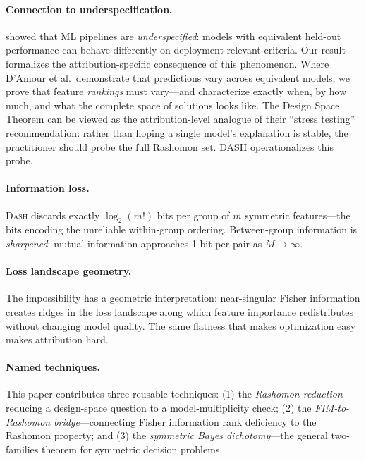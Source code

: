 \documentclass{article}
\newcommand{\DASH}{\textsc{Dash}}
\begin{document}
\paragraph{Connection to underspecification.}
\citep{damour2022underspecification} showed that ML pipelines are \emph{underspecified}: models with equivalent held-out performance can behave differently on deployment-relevant criteria. Our result formalizes the attribution-specific consequence of this phenomenon. Where D'Amour et al.\ demonstrate that predictions vary across equivalent models, we prove that feature \emph{rankings} must vary---and characterize exactly when, by how much, and what the complete space of solutions looks like. The Design Space Theorem can be viewed as the attribution-level analogue of their ``stress testing'' recommendation: rather than hoping a single model's explanation is stable, the practitioner should probe the full Rashomon set. DASH operationalizes this probe.

\paragraph{Information loss.}
\DASH{} discards exactly $\log_2(m!)$ bits per group of $m$ symmetric features---the bits encoding the unreliable within-group ordering. Between-group information is \emph{sharpened}: mutual information approaches 1 bit per pair as $M \to \infty$.

\paragraph{Loss landscape geometry.}
The impossibility has a geometric interpretation: near-singular Fisher information creates ridges in the loss landscape along which feature importance redistributes without changing model quality. The same flatness that makes optimization easy makes attribution hard.

\paragraph{Named techniques.}
This paper contributes three reusable techniques: (1) the \emph{Rashomon reduction}---reducing a design-space question to a model-multiplicity check; (2) the \emph{FIM-to-Rashomon bridge}---connecting Fisher information rank deficiency to the Rashomon property; and (3) the \emph{symmetric Bayes dichotomy}---the general two-families theorem for symmetric decision problems.
\end{document}

